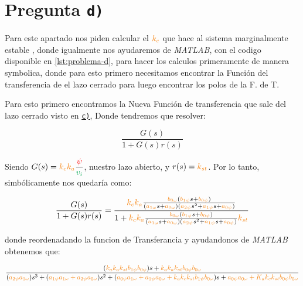\section{Pregunta \texttt{d)}}\label{pregunta-d}

Para este apartado nos piden calcular el $\nara{k_{c}}$ que hace al sistema marginalmente estable , donde igualmente nos ayudaremos de \textit{MATLAB}, con el codigo disponible en \autoref{lst:problema-d}, para hacer los calculos primeramente de manera symbolica, donde para esto primero necesitamos encontrar la Función del transferencia de el lazo cerrado para luego encontrar los polos de la F. de T.

Para esto primero encontramos la Nueva Función de transferencia que sale del lazo cerrado visto en \hyperref[pregunta-c]{\texttt{c)}}, Donde tendremos que resolver:

\begin{equation}
    \frac{G(s)}{1 + G(s)r(s)}
\end{equation}

Siendo \( G(s) = \nara{k_c k_a} \dfrac{\rojo{\psi}}{\verd{v_i}} \), nuestro lazo abierto, y \( r(s) = \nara{k_{st}} \). Por lo tanto, simbólicamente nos quedaría como:


\begin{equation}
    \frac{G(s)}{1 + G(s)r(s)} = \dfrac{\nara{k_ck_a} \frac{\nara{\nara{b_{0\omega}}}\left(\nara{b_{1\psi}}s + \nara{b_{0\psi}}\right)}
    {\left(\nara{a_{1\omega}}s + \nara{a_{0\omega}}\right)\left(\nara{a_{2\psi}}s^{2} + \nara{a_{1\psi}}s + \nara{a_{0\psi}}\right)}}{1+\nara{k_ck_a} \frac{\nara{\nara{b_{0\omega}}}\left(\nara{b_{1\psi}}s + \nara{b_{0\psi}}\right)}
    {\left(\nara{a_{1\omega}}s + \nara{a_{0\omega}}\right)\left(\nara{a_{2\psi}}s^{2} + \nara{a_{1\psi}}s + \nara{a_{0\psi}}\right)}\nara{k_{st}}}
\end{equation}

donde reordenadando la funcion de Transferancia y ayudandonos de \textit{MATLAB} obtenemos que:

\begin{equation}
    \frac{(\nara{k_a k_a k_{st} b_{1\psi} b_{0\psi}})s + \nara{k_a k_a k_{st} b_{0\psi} b_{0\omega}}}{(\nara{a_{2\psi} a_{1\omega}})s^3 + (\nara{a_{1\psi} a_{1\omega} + a_{2\psi} a_{0\omega}})s^2 + (\nara{a_{0\psi} a_{1\omega} + a_{1\psi} a_{0\omega} + k_a k_c k_{st} b_{1\psi} b_{0\omega}})s + \nara{a_{0\psi} a_{0\omega} + K_a k_c k_{st} b_{0\psi} b_{0\omega}}}
\end{equation}

